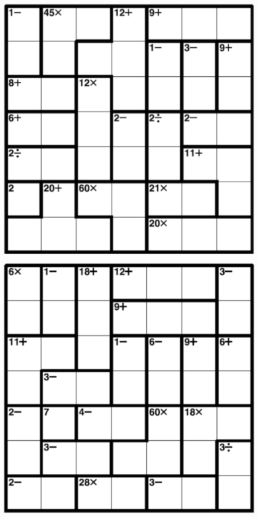 
\includegraphics[scale=1]{Gambar/Lampiran/7x7_5.png}

\includegraphics[scale=1]{Gambar/Lampiran/7x7_6.png}

